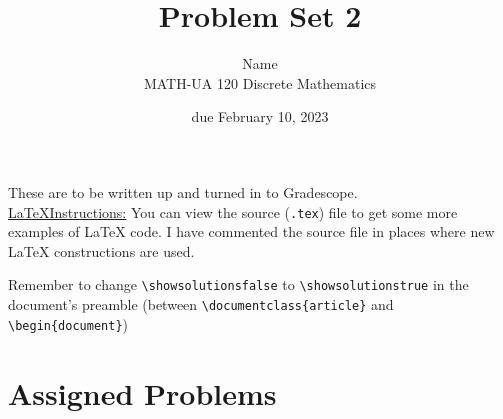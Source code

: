 \documentclass{article}
\title{Problem Set 2}
\author{%
    Name
\\  MATH-UA 120 Discrete Mathematics
}
\date{due February 10, 2023}
\newif\ifshowsolutions
\newcommand{\danger}{\marginpar[\hfill\dbend]{\dbend\hfill}}
\theoremstyle{definition}
\begin{document}
\maketitle



These are to be written up and turned in to Gradescope.\\



\ifshowsolutions
    \SetupExSheets{solution/print=true}
\else
    \danger
 \underline{ \LaTeX  Instructions:}  You can view the source (\texttt{.tex}) file to get some more examples of \LaTeX{} code.  I have commented the source file in places where new \LaTeX{} constructions are used.
  
  Remember to change \verb|\showsolutionsfalse| to \verb|\showsolutionstrue|
    in the document's preamble 
    (between \verb|\documentclass{article}| and \verb|\begin{document}|)
\fi

\section*{Assigned Problems}
\end{document}
